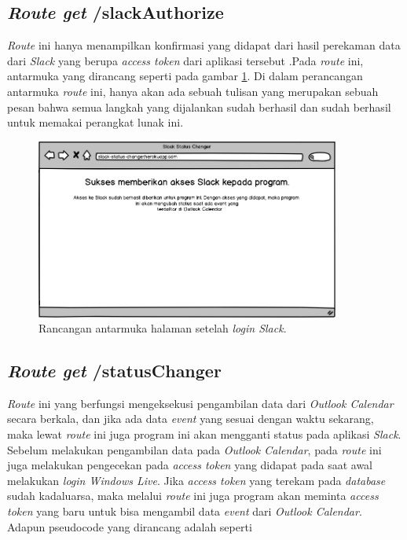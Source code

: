 \subsection{\textit{Route get} /slackAuthorize}
\label{sec:get/slackAuthorize}
\textit{Route} ini hanya menampilkan konfirmasi yang didapat dari hasil perekaman data dari \textit{Slack} yang berupa \textit{access token} dari aplikasi tersebut .Pada \textit{route} ini, antarmuka yang dirancang seperti pada gambar \ref{fig:mockup_halaman_ketiga}. Di dalam perancangan antarmuka \textit{route} ini, hanya akan ada sebuah tulisan yang merupakan sebuah pesan bahwa semua langkah yang dijalankan sudah berhasil dan sudah berhasil untuk memakai perangkat lunak ini.  

\begin{figure}[h]
  \includegraphics[width=10cm]{./Gambar/MockUp/Step3.png}
  \centering
  \caption{Rancangan antarmuka halaman setelah \textit{login Slack}.}
  \label{fig:mockup_halaman_ketiga}
\end{figure}

\subsection{\textit{Route get} /statusChanger}
\label{sec:get/statusChanger}
\textit{Route} ini yang berfungsi mengeksekusi pengambilan data dari \textit{Outlook Calendar} secara berkala, dan jika ada data \textit{event} yang sesuai dengan waktu sekarang, maka lewat \textit{route} ini juga program ini akan mengganti status pada aplikasi \textit{Slack}. Sebelum melakukan pengambilan data pada \textit{Outlook Calendar}, pada \textit{route} ini juga melakukan pengecekan pada \textit{access token} yang didapat pada saat awal melakukan \textit{login Windows Live}. Jika \textit{access token} yang terekam pada \textit{database} sudah kadaluarsa, maka melalui \textit{route} ini juga program akan meminta \textit{access token} yang baru untuk bisa mengambil data \textit{event} dari \textit{Outlook Calendar}. Adapun pseudocode yang dirancang adalah seperti\\
\\

